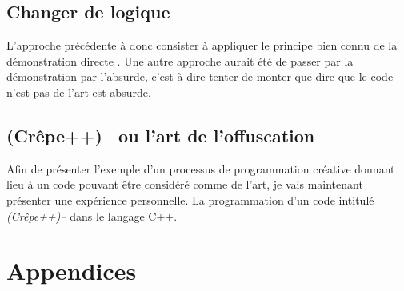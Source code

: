 \documentclass[12pt]{article} %
\begin{document}
\subsection{Changer de logique}
L'approche précédente à donc consister à appliquer le principe bien connu de la démonstration directe \cite{MDidier-Renforcement}. Une autre approche aurait été de passer par la démonstration par l'absurde, c'est-à-dire tenter de monter que dire que le code n'est pas de l'art est absurde.


\subsection{(Crêpe++)-- ou l'art de l'offuscation}
Afin de présenter l'exemple d'un processus de programmation créative donnant lieu à un code pouvant être considéré comme de l'art, je vais maintenant présenter une expérience personnelle. La programmation d'un code intitulé \textit{(Crêpe++)--} dans le langage C++. 


\newpage
\section{Appendices}

\printglossary[type=\acronymtype, title=Acronymes]

\printglossary[title=Glossaire]


\newpage



\restoregeometry
\end{document}
